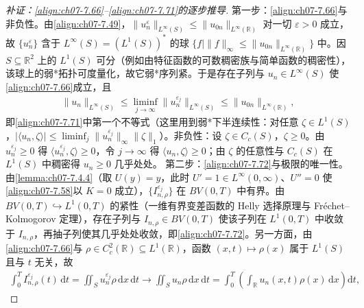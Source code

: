﻿\documentclass[../../main.tex]{subfiles}%
\begin{document}
\begin{proof}[补证：\eqref{align:ch07-7.66}--\eqref{align:ch07-7.71}的逐步推导]
第一步：\eqref{align:ch07-7.66}与非负性。由\eqref{align:ch07-7.49}，$\|u_n^\varepsilon\|_{L^\infty(S)}\leqslant\|u_{0n}\|_{L^\infty(\mathbb{R})}$ 对一切 $\varepsilon>0$ 成立，故 $\{u_n^\varepsilon\}$ 含于 $L^\infty(S)=(L^1(S))^*$ 的球 $\{f\mid\|f\|_\infty\leqslant\|u_{0n}\|_{L^\infty(\mathbb{R})}\}$ 中。因 $S\subseteq\mathbb{R}^2$ 上的 $L^1(S)$ 可分（例如由特征函数的可数稠密族与简单函数的稠密性），该球上的弱*拓扑可度量化，故它弱*序列紧。于是存在子列与 $u_n\in L^\infty(S)$ 使\eqref{align:ch07-7.66}成立，且
\begin{align*}
\|u_n\|_{L^\infty(S)}\leqslant\liminf_{j\to\infty}\|u_n^{\varepsilon_j}\|_{L^\infty(S)}\leqslant\|u_{0n}\|_{L^\infty(\mathbb{R})},
\end{align*}
即\eqref{align:ch07-7.71}中第一个不等式（这里用到弱*下半连续性：对任意 $\zeta\in L^1(S)$，$|\langle u_n,\zeta\rangle|\leqslant\liminf_j\|u_n^{\varepsilon_j}\|_\infty\|\zeta\|_1$）。非负性：设 $\zeta\in C_c(S)$，$\zeta\geqslant0$。由 $u_n^{\varepsilon_j}\geqslant0$ 得 $\langle u_n^{\varepsilon_j},\zeta\rangle\geqslant0$，令 $j\to\infty$ 得 $\langle u_n,\zeta\rangle\geqslant0$；由 $\zeta$ 的任意性与 $C_c(S)$ 在 $L^1(S)$ 中稠密得 $u_n\geqslant0$ 几乎处处。
第二步：\eqref{align:ch07-7.72}与极限的唯一性。由\cref{lemma:ch07-7.4.4}（取 $U(y)=y$，此时 $U'=1\in L^\infty(0,\infty)$、$U''=0$ 使\eqref{align:ch07-7.58}以 $K=0$ 成立），$\{I_{n,\rho}^{\varepsilon_j}\}$ 在 $BV(0,T)$ 中有界。由 $BV(0,T)\hookrightarrow L^1(0,T)$ 的紧性（一维有界变差函数的 Helly 选择原理与 Fréchet--Kolmogorov 定理），存在子列与 $I_{n,\rho}\in BV(0,T)$ 使该子列在 $L^1(0,T)$ 中收敛于 $I_{n,\rho}$，再抽子列使其几乎处处收敛，即\eqref{align:ch07-7.72}。另一方面，由\eqref{align:ch07-7.66}与 $\rho\in C^2_c(\mathbb{R})\subseteq L^1(\mathbb{R})$，函数 $(x,t)\mapsto\rho(x)$ 属于 $L^1(S)$ 且与 $t$ 无关，故
\begin{align*}
\int_0^TI_{n,\rho}^{\varepsilon_j}(t)\,\mathrm{d}t=\iint_Su_n^{\varepsilon_j}\rho\,\mathrm{d}x\,\mathrm{d}t\to\iint_Su_n\rho\,\mathrm{d}x\,\mathrm{d}t=\int_0^T\left(\int_{\mathbb{R}}u_n(x,t)\rho(x)\,\mathrm{d}x\right)\mathrm{d}t,

\end{align*}
\end{proof}
\end{document}
